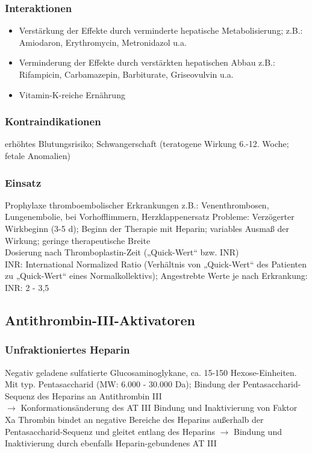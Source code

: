 \documentclass[10pt,a4paper]{report}
\begin{document}
\subsubsection{Interaktionen} %
\label{par:interaktionen}
\begin{itemize}
	\item Verstärkung der Effekte durch verminderte hepatische 
	Metabolisierung; z.B.: Amiodaron, Erythromycin, Metronidazol u.a.
	\item Verminderung der Effekte durch verstärkten hepatischen Abbau
	z.B.: Rifampicin, Carbamazepin, Barbiturate, Griseovulvin u.a.
	\item Vitamin-K-reiche Ernährung
\end{itemize}
\subsubsection{Kontraindikationen} %
\label{par:kontraindikationen}
erhöhtes Blutungsrisiko; Schwangerschaft (teratogene Wirkung 6.-12. Woche; fetale Anomalien)
\subsubsection{Einsatz} %
\label{par:einsatz}
Prophylaxe thromboembolischer Erkrankungen z.B.: 	Venenthrombosen, Lungenembolie, bei Vorhofflimmern, Herzklappenersatz Probleme: Verzögerter Wirkbeginn (3-5 d); Beginn der Therapie mit Heparin; variables Ausmaß der Wirkung; geringe therapeutische Breite\\
 Dosierung nach Thromboplastin-Zeit („Quick-Wert“ bzw. INR)\\
INR: International Normalized Ratio (Verhältnis von „Quick-Wert“ des Patienten zu „Quick-Wert“ eines Normalkollektivs); Angestrebte Werte je nach Erkrankung:	 INR:	 2 - 3,5
\subsection{Antithrombin-III-Aktivatoren} %
\label{ssub:antithrombin_iii_aktivatoren}
\subsubsection{Unfraktioniertes Heparin} %
\label{par:unfraktioniertes_heparin}
Negativ geladene sulfatierte Glucosaminoglykane, ca. 15-150 Hexose-Einheiten. Mit typ. Pentasaccharid (MW: 6.000 - 30.000 Da); Bindung der Pentasaccharid-Sequenz des Heparins an Antithrombin III \\
$\rightarrow$ Konformationsänderung des AT III Bindung und Inaktivierung von Faktor Xa Thrombin bindet an negative Bereiche des Heparins außerhalb der Pentasaccharid-Sequenz und gleitet entlang des Heparins $\rightarrow$ Bindung und Inaktivierung durch ebenfalls Heparin-gebundenes AT III 
\end{document}
